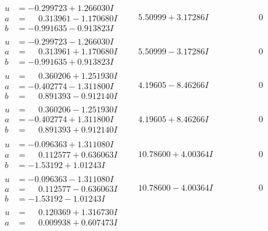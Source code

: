 \documentclass[1p]{elsarticle_modified}
\theoremstyle{definition}
\begin{document}
$$\begin{array}{c|c|c}
 \hline 
\begin{aligned}
u &= -0.299723 + 1.266030 I \\
a &= \phantom{-}0.313961 - 1.170680 I \\
b &= -0.991635 - 0.913823 I\end{aligned}
 & \phantom{-}5.50999 + 3.17286 I & \phantom{-0.000000 } 0 \\ \hline\begin{aligned}
u &= -0.299723 - 1.266030 I \\
a &= \phantom{-}0.313961 + 1.170680 I \\
b &= -0.991635 + 0.913823 I\end{aligned}
 & \phantom{-}5.50999 - 3.17286 I & \phantom{-0.000000 } 0 \\ \hline\begin{aligned}
u &= \phantom{-}0.360206 + 1.251930 I \\
a &= -0.402774 - 1.311800 I \\
b &= \phantom{-}0.891393 - 0.912140 I\end{aligned}
 & \phantom{-}4.19605 - 8.46266 I & \phantom{-0.000000 } 0 \\ \hline\begin{aligned}
u &= \phantom{-}0.360206 - 1.251930 I \\
a &= -0.402774 + 1.311800 I \\
b &= \phantom{-}0.891393 + 0.912140 I\end{aligned}
 & \phantom{-}4.19605 + 8.46266 I & \phantom{-0.000000 } 0 \\ \hline\begin{aligned}
u &= -0.096363 + 1.311080 I \\
a &= \phantom{-}0.112577 + 0.636063 I \\
b &= -1.53192 + 1.01243 I\end{aligned}
 & \phantom{-}10.78600 + 4.00364 I & \phantom{-0.000000 } 0 \\ \hline\begin{aligned}
u &= -0.096363 - 1.311080 I \\
a &= \phantom{-}0.112577 - 0.636063 I \\
b &= -1.53192 - 1.01243 I\end{aligned}
 & \phantom{-}10.78600 - 4.00364 I & \phantom{-0.000000 } 0 \\ \hline\begin{aligned}
u &= \phantom{-}0.120369 + 1.316730 I \\
a &= \phantom{-}0.009938 + 0.607473 I \\

\end{aligned}
\end{array}$$
\end{document}
